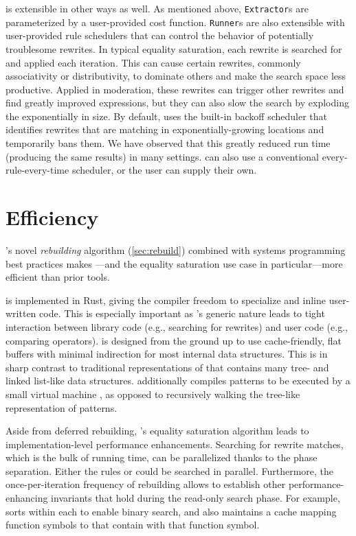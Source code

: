 \egg is extensible in other ways as well.
As mentioned above, \texttt{Extractor}s are parameterized by a user-provided
  cost function.
\texttt{Runner}s are also extensible with user-provided rule schedulers that can
  control the behavior of potentially troublesome rewrites.
\label{sec:rule-scheduling}
In typical equality saturation, each rewrite is searched for and applied each
  iteration.
This can cause certain rewrites, commonly associativity or distributivity,
  to dominate others and make the search space less productive.
Applied in moderation, these rewrites can trigger other rewrites and find
  greatly improved expressions,
  but they can also slow the search by
  exploding the \egraph exponentially in size.
By default, \egg uses the built-in backoff scheduler
  that identifies rewrites that are matching in exponentially-growing
  locations and temporarily bans them.
We have observed that this greatly reduced run time (producing the same results)
  in many settings.
\egg can also use a conventional every-rule-every-time scheduler, or the user
  can supply their own.

\section{Efficiency}
\label{sec:egg-efficient}

\egg's novel \textit{rebuilding} algorithm (\autoref{sec:rebuild})
combined with systems programming best practices
  makes \egraphs---and the equality saturation
  use case in particular---more efficient than prior tools.

\egg is implemented in Rust, giving the compiler freedom to
  specialize and inline user-written code.
This is especially important as
  \egg's generic nature leads to tight interaction
  between library code
  (e.g., searching for rewrites) and user code (e.g., comparing operators).
\egg is designed from the ground up to use cache-friendly,
  flat buffers with minimal indirection for most internal data structures.
This is in sharp contrast to traditional representations of \egraphs
  \cite{nelson, simplify} that contains many tree- and linked list-like data
  structures.
\egg additionally compiles patterns to be executed by a small virtual machine
  \cite{ematching}, as opposed to recursively walking the tree-like
  representation of patterns.

Aside from deferred rebuilding, \egg's equality saturation algorithm leads to
  implementation-level performance enhancements.
Searching for rewrite matches, which is the bulk of running time, can be
  parallelized thanks to the phase separation.
Either the rules or \eclasses could be searched in parallel.
Furthermore, the once-per-iteration frequency of rebuilding allows \egg to
  establish other performance-enhancing invariants that hold during the
  read-only search phase.
For example, \egg sorts \enodes within each \eclass to enable binary search, and
  also maintains a cache mapping function symbols to \eclasses that
  contain \enodes with that function symbol.

